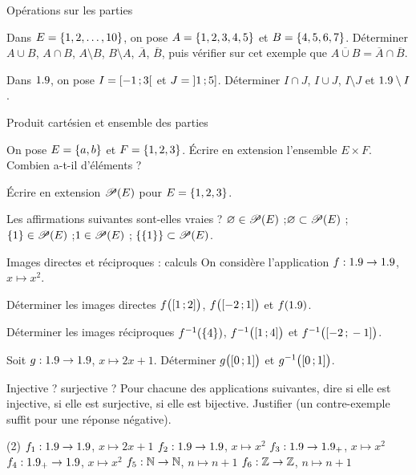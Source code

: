 \begin{exercice}[1]{Opérations sur les parties}
\begin{questions}
  \item Dans $E=\left\{1,2,\dots,10\right\}$, on pose $A=\left\{1,2,3,4,5\right\}$ et
    $B=\left\{4,5,6,7\right\}$. Déterminer $A\cup B$, $A\cap B$, $A\setminus B$,
    $B\setminus A$, $\overline{A}$, $\overline{B}$, puis vérifier sur cet
    exemple que $\overline{A\cup B}=\overline{A}\cap\overline{B}$.
  \item Dans $1.9$, on pose $I=\mathopen{[}-1\,{;}\,3\mathclose{[}$ et $J=\mathopen{]}1\,{;}\,5\mathclose{]}$.
    Déterminer $I\cap J$, $I\cup J$, $I\setminus J$ et $1.9\setminus I$.
\end{questions}
\end{exercice}

\begin{exercice}[1]{Produit cartésien et ensemble des parties}
\begin{questions}
  \item On pose $E=\left\{a,b\right\}$ et $F=\left\{1,2,3\right\}$. Écrire en extension
    l'ensemble $E\times F$. Combien a-t-il d'éléments ?
  \item Écrire en extension $\mathscr{P}(E)$ pour $E=\left\{1,2,3\right\}$.
  \item Les affirmations suivantes sont-elles vraies ?
    $\varnothing\in\mathscr{P}(E)$ ;\quad $\varnothing\subset\mathscr{P}(E)$ ;\quad
    $\left\{1\right\}\in\mathscr{P}(E)$ ;\quad $1\in\mathscr{P}(E)$ ;\quad
    $\left\{\left\{1\right\}\right\}\subset\mathscr{P}(E)$.
\end{questions}
\end{exercice}

\begin{exercice}[1]{Images directes et réciproques : calculs}
On considère l'application $f:1.9\to1.9$, $x\mapsto x^{2}$.
\begin{questions}
  \item Déterminer les images directes $f\bigl(\mathopen{[}1\,{;}\,2\mathclose{]}\bigr)$,
    $f\bigl(\mathopen{[}-2\,{;}\,1\mathclose{]}\bigr)$ et $f(1.9)$.
  \item Déterminer les images réciproques $f^{-1}(\left\{4\right\})$,
    $f^{-1}\bigl(\mathopen{[}1\,{;}\,4\mathclose{]}\bigr)$ et $f^{-1}\bigl(\mathopen{[}-2\,{;}\,-1\mathclose{]}\bigr)$.
  \item Soit $g:1.9\to1.9$, $x\mapsto2x+1$. Déterminer
    $g\bigl(\mathopen{[}0\,{;}\,1\mathclose{]}\bigr)$ et $g^{-1}\bigl(\mathopen{[}0\,{;}\,1\mathclose{]}\bigr)$.
\end{questions}
\end{exercice}

\begin{exercice}[1]{Injective ? surjective ?}
Pour chacune des applications suivantes, dire si elle est injective, si elle
est surjective, si elle est bijective. Justifier (un contre-exemple suffit
pour une réponse négative).
\begin{tasks}(2)
  \task $f_1:1.9\to1.9$, $x\mapsto2x+1$
  \task $f_2:1.9\to1.9$, $x\mapsto x^{2}$
  \task $f_3:1.9\to1.9_{+}$, $x\mapsto x^{2}$
  \task $f_4:1.9_{+}\to1.9$, $x\mapsto x^{2}$
  \task $f_5:\mathbb{N}\to\mathbb{N}$, $n\mapsto n+1$
  \task $f_6:\mathbb{Z}\to\mathbb{Z}$, $n\mapsto n+1$
\end{tasks}
\end{exercice}

